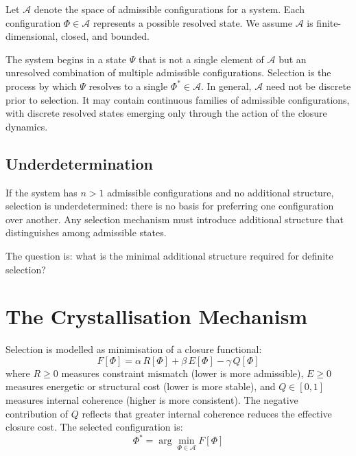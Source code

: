 \documentclass[12pt]{article}
\begin{document}
Let $\mathcal{A}$ denote the space of admissible configurations for a system. Each configuration $\Phi \in \mathcal{A}$ represents a possible resolved state. We assume $\mathcal{A}$ is finite-dimensional, closed, and bounded.

The system begins in a state $\Psi$ that is not a single element of $\mathcal{A}$ but an unresolved combination of multiple admissible configurations. Selection is the process by which $\Psi$ resolves to a single $\Phi^* \in \mathcal{A}$. In general, $\mathcal{A}$ need not be discrete prior to selection. It may contain continuous families of admissible configurations, with discrete resolved states emerging only through the action of the closure dynamics.

\subsection{Underdetermination}

If the system has $n > 1$ admissible configurations and no additional structure, selection is underdetermined: there is no basis for preferring one configuration over another. Any selection mechanism must introduce additional structure that distinguishes among admissible states.

The question is: what is the minimal additional structure required for definite selection?

\section{The Crystallisation Mechanism}\label{sec:mechanism}

Selection is modelled as minimisation of a closure functional:
\begin{equation}\label{eq:functional}
    F[\Phi] = \alpha\, R[\Phi] + \beta\, E[\Phi] - \gamma\, Q[\Phi]
\end{equation}
where $R \geq 0$ measures constraint mismatch (lower is more admissible), $E \geq 0$ measures energetic or structural cost (lower is more stable), and $Q \in [0,1]$ measures internal coherence (higher is more consistent). The negative contribution of $Q$ reflects that greater internal coherence reduces the effective closure cost. The selected configuration is:
\begin{equation}
    \Phi^* = \arg\min_{\Phi \in \mathcal{A}} F[\Phi]
\end{equation}
\end{document}

